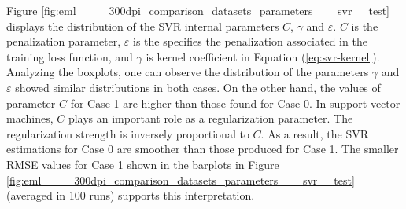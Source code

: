 \documentclass[a4paper,12pt, english]{article}
\begin{document}
Figure \ref{fig:eml____300dpi_comparison_datasets_parameters___svr__test} displays the distribution of the SVR internal parameters $C$, $\gamma$ and $\varepsilon$.
$C$ is the penalization parameter, $\varepsilon$ is the  specifies the penalization  associated in the training loss function,  and $\gamma$ is kernel coefficient in Equation (\ref{eq:svr-kernel}).
Analyzing the boxplots, one can observe the distribution of the parameters $\gamma$ and $\varepsilon$ showed similar distributions in both cases.
On the other hand, the values of parameter $C$  for Case 1 are higher than those found for Case 0.
In support vector machines, $C$  plays an important role as a regularization parameter. The regularization strength is inversely proportional to $C$. As a result, the SVR estimations for Case 0 are smoother than those produced for Case 1. The smaller RMSE values for Case 1  shown in the barplots in Figure  \ref{fig:eml____300dpi_comparison_datasets_parameters___svr__test} (averaged in 100 runs) supports this interpretation. 
% 
\end{document}
